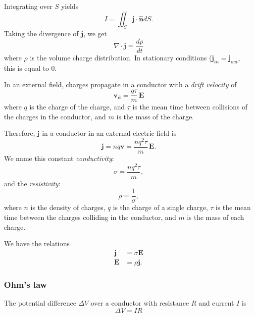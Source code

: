 \documentclass[a4paper, 12pt]{article}
\renewcommand{\vec}[1]{\mathbf{#1}}
\newcommand{\E}{\ensuremath{\vec{E}}}
\renewcommand{\j}{\ensuremath{\vec{j}}}
\let\tmp\hat
\renewcommand{\hat}[1]{\vec{\tmp{#1}}}
\begin{document}
        Integrating over $S$ yields
        \begin{equation}
            I = \iint_S \j\cdot\hat{n}dS.
        \end{equation}
        Taking the divergence of $\j$, we get
        \begin{equation}
            \nabla \cdot \j = \frac{d\rho}{dt}
        \end{equation}
        where $\rho$ is the volume charge distribution.
        In stationary conditions ($\j_{in} = \j_{out}$, this is equal to 0. 
    
        In an external field, charges propagate in a conductor with a \textit{drift velocity} of
        \begin{equation}
            \vec{v_d} = \frac{q\tau}{m}\,\E
        \end{equation}
        where $q$ is the charge of the charge, and $\tau$ is the mean time between collisions of the charges in the conductor, 
        and $m$ is the mass of the charge.
        
        Therefore, $\j$ in a conductor in an external electric field is
        \begin{equation}
            \j = nq\vec{v} = \frac{nq^2\tau}{m}\,\E.
        \end{equation}
        We name this constant \textit{conductivity}: 
        \begin{equation}
            \sigma = \frac{nq^2\tau}{m},
        \end{equation}
        and the \textit{resistivity}:
        \begin{equation}
            \rho = \frac{1}{\sigma},
        \end{equation}
        where $n$ is the density of charges, $q$ is the charge of a single charge, 
        $\tau$ is the mean time between the charges colliding in the conductor, and $m$ is the mass of each charge. 
        
        We have the relations 
        \begin{align}
            \j &= \sigma \E \\
            \E &= \rho \j.
        \end{align}

    \subsubsection{Ohm's law}
        The potential difference $\Delta V$ over a conductor with resistance $R$ and current $I$ is
        \begin{equation}
            \Delta V = IR
        \end{equation}
    
\end{document}
